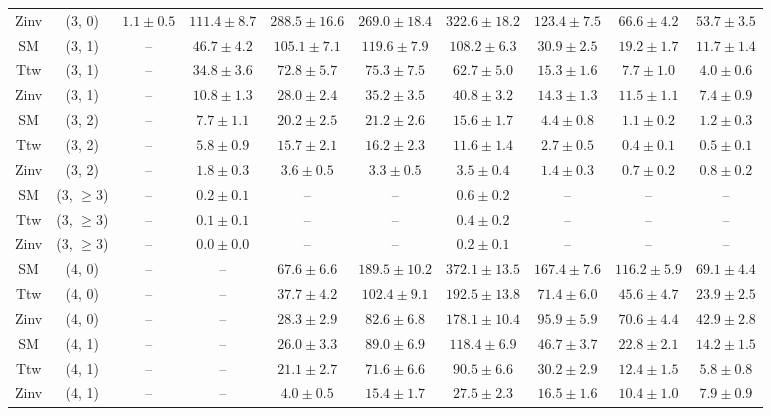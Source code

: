\begin{table}[h!]
{\begin{tabular}{cccccccccc}
	Zinv & (3, 0) & $1.1\pm 0.5$ & $111.4\pm 8.7$ & $288.5\pm 16.6$ & $269.0\pm 18.4$ & $322.6\pm 18.2$ & $123.4\pm 7.5$ & $66.6\pm 4.2$ & $53.7\pm 3.5$ \\[0.5ex] 
	SM & (3, 1) & -- & $46.7\pm 4.2$ & $105.1\pm 7.1$ & $119.6\pm 7.9$ & $108.2\pm 6.3$ & $30.9\pm 2.5$ & $19.2\pm 1.7$ & $11.7\pm 1.4$ \\[0.5ex] 
	Ttw & (3, 1) & -- & $34.8\pm 3.6$ & $72.8\pm 5.7$ & $75.3\pm 7.5$ & $62.7\pm 5.0$ & $15.3\pm 1.6$ & $7.7\pm 1.0$ & $4.0\pm 0.6$ \\[0.5ex] 
	Zinv & (3, 1) & -- & $10.8\pm 1.3$ & $28.0\pm 2.4$ & $35.2\pm 3.5$ & $40.8\pm 3.2$ & $14.3\pm 1.3$ & $11.5\pm 1.1$ & $7.4\pm 0.9$ \\[0.5ex] 
	SM & (3, 2) & -- & $7.7\pm 1.1$ & $20.2\pm 2.5$ & $21.2\pm 2.6$ & $15.6\pm 1.7$ & $4.4\pm 0.8$ & $1.1\pm 0.2$ & $1.2\pm 0.3$ \\[0.5ex] 
	Ttw & (3, 2) & -- & $5.8\pm 0.9$ & $15.7\pm 2.1$ & $16.2\pm 2.3$ & $11.6\pm 1.4$ & $2.7\pm 0.5$ & $0.4\pm 0.1$ & $0.5\pm 0.1$ \\[0.5ex] 
	Zinv & (3, 2) & -- & $1.8\pm 0.3$ & $3.6\pm 0.5$ & $3.3\pm 0.5$ & $3.5\pm 0.4$ & $1.4\pm 0.3$ & $0.7\pm 0.2$ & $0.8\pm 0.2$ \\[0.5ex] 
	SM & (3, $\ge3$) & -- & $0.2\pm 0.1$ & -- & -- & $0.6\pm 0.2$ & -- & -- & -- \\[0.5ex] 
	Ttw & (3, $\ge3$) & -- & $0.1\pm 0.1$ & -- & -- & $0.4\pm 0.2$ & -- & -- & -- \\[0.5ex] 
	Zinv & (3, $\ge3$) & -- & $0.0\pm 0.0$ & -- & -- & $0.2\pm 0.1$ & -- & -- & -- \\[0.5ex] 
	SM & (4, 0) & -- & -- & $67.6\pm 6.6$ & $189.5\pm 10.2$ & $372.1\pm 13.5$ & $167.4\pm 7.6$ & $116.2\pm 5.9$ & $69.1\pm 4.4$ \\[0.5ex] 
	Ttw & (4, 0) & -- & -- & $37.7\pm 4.2$ & $102.4\pm 9.1$ & $192.5\pm 13.8$ & $71.4\pm 6.0$ & $45.6\pm 4.7$ & $23.9\pm 2.5$ \\[0.5ex] 
	Zinv & (4, 0) & -- & -- & $28.3\pm 2.9$ & $82.6\pm 6.8$ & $178.1\pm 10.4$ & $95.9\pm 5.9$ & $70.6\pm 4.4$ & $42.9\pm 2.8$ \\[0.5ex] 
	SM & (4, 1) & -- & -- & $26.0\pm 3.3$ & $89.0\pm 6.9$ & $118.4\pm 6.9$ & $46.7\pm 3.7$ & $22.8\pm 2.1$ & $14.2\pm 1.5$ \\[0.5ex] 
	Ttw & (4, 1) & -- & -- & $21.1\pm 2.7$ & $71.6\pm 6.6$ & $90.5\pm 6.6$ & $30.2\pm 2.9$ & $12.4\pm 1.5$ & $5.8\pm 0.8$ \\[0.5ex] 
	Zinv & (4, 1) & -- & -- & $4.0\pm 0.5$ & $15.4\pm 1.7$ & $27.5\pm 2.3$ & $16.5\pm 1.6$ & $10.4\pm 1.0$ & $7.9\pm 0.9$ \\[0.5ex] 

\end{tabular}}
\end{table}
